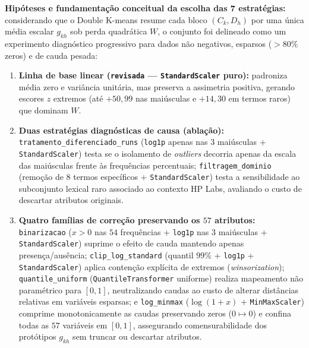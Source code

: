 \documentclass[a4paper,11pt]{article}
\begin{document}
\textbf{Hipóteses e fundamentação conceitual da escolha das 7 estratégias:} considerando que o Double K-means resume cada bloco $(C_k, D_h)$ por uma única média escalar $g_{kh}$ sob perda quadrática $W$, o conjunto foi delineado como um experimento diagnóstico progressivo para dados não negativos, esparsos ($>80\%$ zeros) e de cauda pesada:
\begin{enumerate}[leftmargin=1.5em, itemsep=0.25em, topsep=0.25em]
  \item \textbf{Linha de base linear (\texttt{revisada} --- \texttt{StandardScaler} puro):} padroniza média zero e variância unitária, mas preserva a assimetria positiva, gerando escores $z$ extremos (até $+50,99$ nas maiúsculas e $+14,30$ em termos raros) que dominam $W$.
  \item \textbf{Duas estratégias diagnósticas de causa (ablação):} \texttt{tratamento\_\allowbreak diferenciado\_\allowbreak runs} (\texttt{log1p} apenas nas $3$ maiúsculas + \texttt{StandardScaler}) testa se o isolamento de \textit{outliers} decorria apenas da escala das maiúsculas frente às frequências percentuais; \texttt{filtragem\_\allowbreak dominio} (remoção de $8$ termos específicos + \texttt{StandardScaler}) testa a sensibilidade ao subconjunto lexical raro associado ao contexto HP Labs, avaliando o custo de descartar atributos originais.
  \item \textbf{Quatro famílias de correção preservando os $57$ atributos:} \texttt{binarizacao} ($x > 0$ nas $54$ frequências + \texttt{log1p} nas $3$ maiúsculas + \texttt{StandardScaler}) suprime o efeito de cauda mantendo apenas presença/ausência; \texttt{clip\_\allowbreak log\_\allowbreak standard} (quantil $99\%$ + \texttt{log1p} + \texttt{StandardScaler}) aplica contenção explícita de extremos (\textit{winsorization}); \texttt{quantile\_\allowbreak uniform} (\texttt{QuantileTransformer} uniforme) realiza mapeamento não paramétrico para $[0,1]$, neutralizando caudas ao custo de alterar distâncias relativas em variáveis esparsas; e \texttt{log\_\allowbreak minmax} ($\log(1+x)$ + \texttt{MinMaxScaler}) comprime monotonicamente as caudas preservando zeros ($0 \mapsto 0$) e confina todas as $57$ variáveis em $[0,1]$, assegurando comensurabilidade dos protótipos $g_{kh}$ sem truncar ou descartar atributos.
\end{enumerate}
\end{document}
